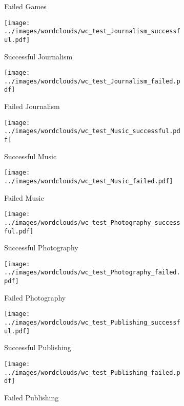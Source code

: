 \documentclass{article}
\begin{document}
{\begin{figure}
\begin{subfigure}[i']{0.2\linewidth}
    \caption{Failed Games}
    \label{fig:Games_f_test}
  \end{subfigure}
  \begin{subfigure}[j]{0.2\linewidth}
    \centering\texttt{[image: ../images/wordclouds/wc\_test\_Journalism\_successful.pdf]}
    \caption{Successful Journalism}
    \label{fig:Journalism_s_test}
  \end{subfigure} 
  \begin{subfigure}[j']{0.2\linewidth}
    \centering\texttt{[image: ../images/wordclouds/wc\_test\_Journalism\_failed.pdf]}
    \caption{Failed Journalism}
    \label{fig:Journalism_f_test}
  \end{subfigure}
  \begin{subfigure}[k]{0.2\linewidth}
    \centering\texttt{[image: ../images/wordclouds/wc\_test\_Music\_successful.pdf]}
    \caption{Successful Music}
    \label{fig:Music_s_test}
  \end{subfigure} 
  \begin{subfigure}[k']{0.2\linewidth}
    \centering\texttt{[image: ../images/wordclouds/wc\_test\_Music\_failed.pdf]}
    \caption{Failed Music}
    \label{fig:Music_f_test}
  \end{subfigure}
  \begin{subfigure}[l]{0.2\linewidth}
    \centering\texttt{[image: ../images/wordclouds/wc\_test\_Photography\_successful.pdf]}
    \caption{Successful Photography}
    \label{fig:Photography_s_test}
  \end{subfigure} 
  \begin{subfigure}[l']{0.2\linewidth}
    \centering\texttt{[image: ../images/wordclouds/wc\_test\_Photography\_failed.pdf]}
    \caption{Failed Photography}
    \label{fig:Photography_f_test}
  \end{subfigure}
    \begin{subfigure}[m]{0.2\linewidth}
    \centering\texttt{[image: ../images/wordclouds/wc\_test\_Publishing\_successful.pdf]}
    \caption{Successful Publishing}
    \label{fig:Publishing_s_test}
  \end{subfigure} 
  \begin{subfigure}[m']{0.2\linewidth}
    \centering\texttt{[image: ../images/wordclouds/wc\_test\_Publishing\_failed.pdf]}
    \caption{Failed Publishing}
    \label{fig:Publishing_f_test}
  \end{subfigure}
    \begin{subfigure}[n]{0.2\linewidth}

\end{subfigure}
\end{figure}}
\end{document}
